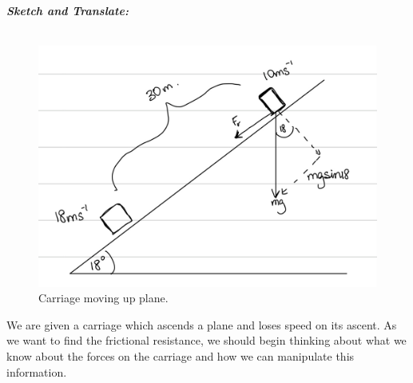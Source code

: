 \begin{subquestions}
\begin{subsubquestions}
\end{subsubquestions}


\subquestion

\textbf{\textit{Sketch and Translate:}} \\ \\
\begin{figure}[H]
	\begin{center}
		\includegraphics[scale=0.25]{../2013/figures/2013q5-2}
		\caption{\label{2013:q5:Sketch2} Carriage moving up plane.}
	\end{center}
\end{figure}
We are given a carriage which ascends a plane and loses speed on its ascent. As we want to find the frictional resistance, we should begin thinking about what we know about the forces on the carriage and how we can manipulate this information.





\end{subquestions}
